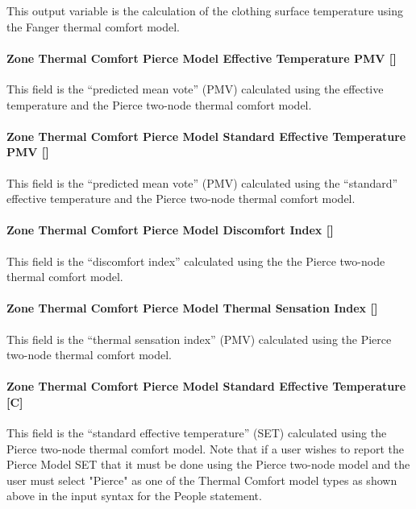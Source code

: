 This output variable is the calculation of the clothing surface temperature using the Fanger thermal comfort model.

\paragraph{Zone Thermal Comfort Pierce Model Effective Temperature PMV {[]}}\label{zone-thermal-comfort-pierce-model-effective-temperature-pmv}

This field is the ``predicted mean vote'' (PMV) calculated using the effective temperature and the Pierce two-node thermal comfort model.

\paragraph{Zone Thermal Comfort Pierce Model Standard Effective Temperature PMV {[]}}\label{zone-thermal-comfort-pierce-model-standard-effective-temperature-pmv}

This field is the ``predicted mean vote'' (PMV) calculated using the ``standard'' effective temperature and the Pierce two-node thermal comfort model.

\paragraph{Zone Thermal Comfort Pierce Model Discomfort Index {[]}}\label{zone-thermal-comfort-pierce-model-discomfort-index}

This field is the ``discomfort index'' calculated using the the Pierce two-node thermal comfort model.

\paragraph{Zone Thermal Comfort Pierce Model Thermal Sensation Index {[]}}\label{zone-thermal-comfort-pierce-model-thermal-sensation-index}

This field is the ``thermal sensation index'' (PMV) calculated using the Pierce two-node thermal comfort model.

\paragraph{Zone Thermal Comfort Pierce Model Standard Effective Temperature {[C]}}\label{zone-thermal-comfort-pierce-model-standard-effective-temperature}

This field is the ``standard effective temperature'' (SET) calculated using the Pierce two-node thermal comfort model.  Note that if a user wishes to report the Pierce Model SET that it must be done using the Pierce two-node model and the user must select "Pierce" as one of the Thermal Comfort model types as shown above in the input syntax for the People statement.

